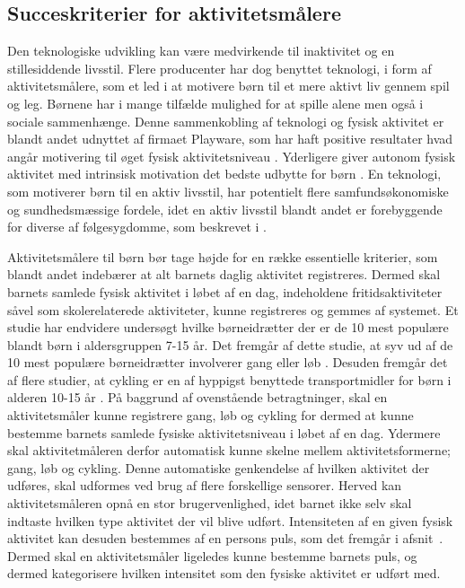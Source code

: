 \subsection{Succeskriterier for aktivitetsmålere} \label{succeskrav}
Den teknologiske udvikling kan være medvirkende til inaktivitet og en stillesiddende livsstil. Flere producenter har dog benyttet teknologi, i form af aktivitetsmålere, som et led i at motivere børn til et mere aktivt liv gennem spil og leg. Børnene har i mange tilfælde mulighed for at spille alene men også i sociale sammenhænge.  %
\citep{Fuhu2015,PowerAbout2015} Denne sammenkobling af teknologi og fysisk aktivitet er blandt andet udnyttet af firmaet Playware, som har haft positive resultater hvad angår motivering til øget fysisk aktivitetsniveau \citep{Rishoej2010}. Yderligere giver autonom fysisk aktivitet med intrinsisk motivation det bedste udbytte for børn \citep{J.Sebire2013}. \newline
En teknologi, som motiverer børn til en aktiv livsstil, har potentielt flere samfundsøkonomiske og sundhedsmæssige fordele, idet en aktiv livsstil blandt andet er forebyggende for diverse af følgesygdomme, som beskrevet i . \newline


Aktivitetsmålere til børn bør tage højde for en række essentielle kriterier, som blandt andet indebærer at alt barnets daglig aktivitet registreres. Dermed skal barnets samlede fysisk aktivitet i løbet af en dag, indeholdene fritidsaktiviteter såvel som skolerelaterede aktiviteter, kunne registreres og gemmes af systemet.  %
Et studie har endvidere undersøgt hvilke børneidrætter der er de 10 mest populære blandt børn i aldersgruppen 7-15 år. Det fremgår af dette studie, at syv ud af de 10 mest populære børneidrætter involverer gang eller løb \citep{Asserhoej2013}. Desuden fremgår det af flere  studier, at cykling er en af hyppigst benyttede transportmidler for børn i alderen 10-15 år \citep{DTU2014,COWI2015}. \newline
På baggrund af ovenstående betragtninger, skal en aktivitetsmåler kunne registrere gang, løb og cykling for dermed at kunne bestemme barnets samlede fysiske aktivitetsniveau i løbet af en dag. Ydermere skal aktivitetmåleren derfor automatisk kunne skelne mellem aktivitetsformerne; gang, løb og cykling. Denne automatiske genkendelse af hvilken aktivitet der udføres, skal udformes ved brug af flere forskellige sensorer. Herved kan aktivitetsmåleren opnå en stor brugervenlighed, idet barnet ikke selv skal indtaste hvilken type aktivitet der vil blive udført. \newline
Intensiteten af en given fysisk aktivitet kan desuden bestemmes af en persons puls, som det fremgår i afsnit~. Dermed skal en aktivitetsmåler ligeledes kunne bestemme barnets puls, og dermed kategorisere hvilken intensitet som den fysiske aktivitet er udført med.


